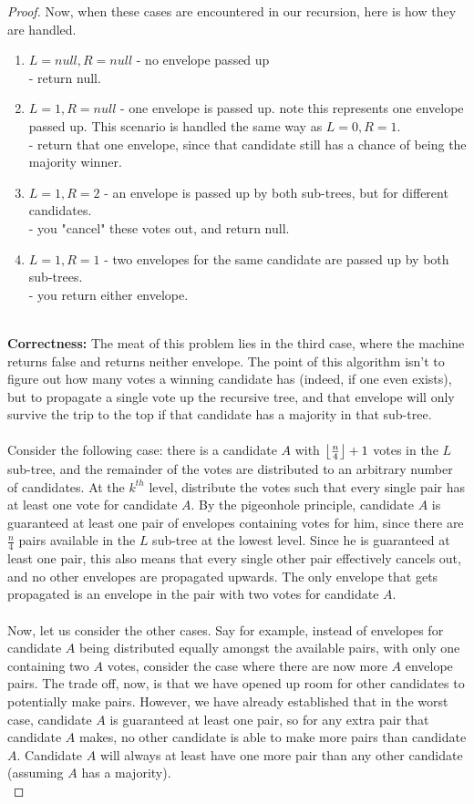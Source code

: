 \documentclass[11pt]{article}
\DeclarePairedDelimiter\floor{\lfloor}{\rfloor}
\begin{document}
\begin{proof}
Now, when these cases are encountered in our recursion, here is how they are handled.
\begin{enumerate}
\item $L = null, R = null$ - no envelope passed up\\
	- return null.
\item $L = 1, R = null$ - one envelope is passed up. note this represents one envelope passed up. This scenario is handled the same way as $L = 0, R = 1$.\\
	- return that one envelope, since that candidate still has a chance of being the majority winner.
\item $L = 1, R = 2$ - an envelope is passed up by both sub-trees, but for different candidates.\\
	- you "cancel" these votes out, and return null.
\item $L = 1, R = 1$ - two envelopes for the same candidate are passed up by both sub-trees.\\
	- you return either envelope.\\\\
\end{enumerate}
\textbf{Correctness:}
The meat of this problem lies in the third case, where the machine returns false and returns neither envelope. The point of this algorithm isn't to figure out how many votes a winning candidate has (indeed, if one even exists), but to propagate a single vote up the recursive tree, and that envelope will only survive the trip to the top if that candidate has a majority in that sub-tree.\\
\\
Consider the following case: there is a candidate $A$ with $\floor*{\frac{n}{4}} + 1$ votes in the $L$ sub-tree, and the remainder of the votes are distributed to an arbitrary number of candidates. At the $k^{th}$ level, distribute the votes such that every single pair has at least one vote for candidate $A$. By the pigeonhole principle, candidate $A$ is guaranteed at least one pair of envelopes containing votes for him, since there are ${\frac{n}{4}}$ pairs available in the $L$ sub-tree at the lowest level. Since he is guaranteed at least one pair, this also means that every single other pair effectively cancels out, and no other envelopes are propagated upwards. The only envelope that gets propagated is an envelope in the pair with two votes for candidate $A$.\\
\\
Now, let us consider the other cases. Say for example, instead of envelopes for candidate $A$ being distributed equally amongst the available pairs, with only one containing two $A$ votes, consider the case where there are now more $A$ envelope pairs. The trade off, now, is that we have opened up room for other candidates to potentially make pairs. However, we have already established that in the worst case, candidate $A$ is guaranteed at least one pair, so for any extra pair that candidate $A$ makes, no other candidate is able to make more pairs than candidate $A$. Candidate $A$ will always at least have one more pair than any other candidate (assuming $A$ has a majority).\\

\end{proof}
\end{document}
